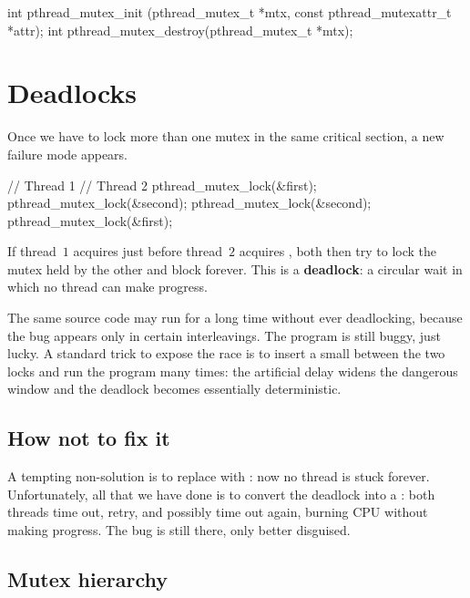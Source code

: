 \begin{codeblock}[language=C, numbers=none]
int pthread_mutex_init   (pthread_mutex_t *mtx, const pthread_mutexattr_t *attr);
int pthread_mutex_destroy(pthread_mutex_t *mtx);
\end{codeblock}

\section{Deadlocks}

Once we have to lock more than one mutex in the same critical section, a new failure mode appears.

\begin{codeblock}[language=C]
// Thread 1                     // Thread 2
pthread_mutex_lock(&first);     pthread_mutex_lock(&second);
pthread_mutex_lock(&second);    pthread_mutex_lock(&first);
\end{codeblock}

If thread~$1$ acquires  just before thread~$2$ acquires , both then try to lock the mutex held by the other and block forever. This is a \textbf{deadlock}: a circular wait in which no thread can make progress.

\begin{warningblock}
The same source code may run for a long time without ever deadlocking, because the bug appears only in certain interleavings. The program is still buggy, just lucky. A standard trick to expose the race is to insert a small  between the two locks and run the program many times: the artificial delay widens the dangerous window and the deadlock becomes essentially deterministic.
\end{warningblock}

\subsection{How not to fix it}

A tempting non-solution is to replace  with : now no thread is stuck forever. Unfortunately, all that we have done is to convert the deadlock into a : both threads time out, retry, and possibly time out again, burning CPU without making progress. The bug is still there, only better disguised.

\subsection{Mutex hierarchy}

